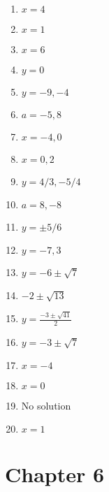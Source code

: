 \documentclass[a4paper]{JAC2003}
\begin{document}
\begin{enumerate}
\item  $x=4$

\item $x=1$

\item $x=6$

\item $y=0$

\item $y=-9,-4$

\item $a=-5,8$

\item $x=-4,0$

\item $x=0,2$

\item $y=4 / 3,-5 / 4$ 

\item $a=8,-8$

\item $y=\pm 5 / 6$

\item $y=-7,3$ 

\item $y=-6 \pm \sqrt{7}$

\item $-2 \pm \sqrt{13}$

\item $y=\frac{-3 \pm \sqrt{41}}{2}$

\item $y=-3 \pm \sqrt{7}$

\item $x=-4$

\item $x=0$

\item No solution

\item $x=1$
\end{enumerate}


\section{Chapter 6}
\end{document}
